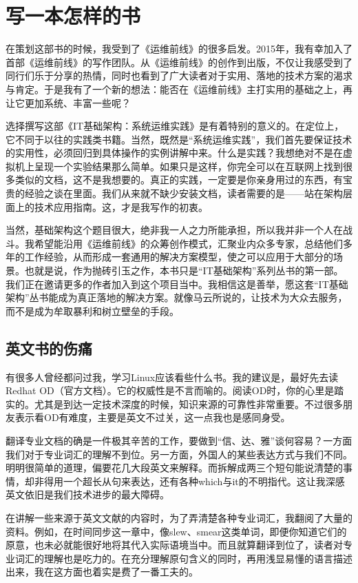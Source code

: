 \documentclass[12pt,UTF8]{ctexbook}
\begin{document}
\section{写一本怎样的书}

在策划这部书的时候，我受到了《运维前线》的很多启发。2015年，我有幸加入了首部《运维前线》的写作团队。从《运维前线》的创作到出版，不仅让我感受到了同行们乐于分享的热情，同时也看到了广大读者对于实用、落地的技术方案的渴求与肯定。于是我有了一个新的想法：能否在《运维前线》主打实用的基础之上，再让它更加系统、丰富一些呢？

选择撰写这部《IT基础架构：系统运维实践》是有着特别的意义的。在定位上，它不同于以往的实践类书籍。当然，既然是“系统运维实践”，我们首先要保证技术的实用性，必须回归到具体操作的实例讲解中来。什么是实践？我想绝对不是在虚拟机上呈现一个实验结果那么简单。如果只是这样，你完全可以在互联网上找到很多类似的文档，这不是我想要的。真正的实践，一定要是你亲身用过的东西，有宝贵的经验之谈在里面。我们从来就不缺少安装文档，读者需要的是——站在架构层面上的技术应用指南。这，才是我写作的初衷。

当然，基础架构这个题目很大，绝非我一人之力所能承担，所以我并非一个人在战斗。我希望能沿用《运维前线》的众筹创作模式，汇聚业内众多专家，总结他们多年的工作经验，从而形成一套通用的解决方案模型，使之可以应用于大部分的场景。也就是说，作为抛砖引玉之作，本书只是“IT基础架构”系列丛书的第一部。我们正在邀请更多的作者加入到这个项目当中。我相信这是善举，愿这套“IT基础架构”丛书能成为真正落地的解决方案。就像马云所说的，让技术为大众去服务，而不是成为牟取暴利和树立壁垒的手段。

\subsection{英文书的伤痛}

有很多人曾经都问过我，学习Linux应该看些什么书。我的建议是，最好先去读Redhat OD（官方文档）。它的权威性是不言而喻的。阅读OD时，你的心里是踏实的。尤其是到达一定技术深度的时候，知识来源的可靠性非常重要。不过很多朋友表示看OD有难度，主要是英文不过关，这一点我也是感同身受。

翻译专业文档的确是一件极其辛苦的工作，要做到“信、达、雅”谈何容易？一方面我们对于专业词汇的理解不到位。另一方面，外国人的某些表达方式与我们不同。明明很简单的道理，偏要花几大段英文来解释。而拆解成两三个短句能说清楚的事情，却非得用一个超长从句来表达，还有各种which与it的不明指代。这让我深感英文依旧是我们技术进步的最大障碍。

在讲解一些来源于英文文献的内容时，为了弄清楚各种专业词汇，我翻阅了大量的资料。例如，在时间同步这一章中，像slew、smear这类单词，即便你知道它们的原意，也未必就能很好地将其代入实际语境当中。而且就算翻译到位了，读者对专业词汇的理解也是吃力的。在充分理解原句含义的同时，再用浅显易懂的语言描述出来，我在这方面也着实是费了一番工夫的。
\end{document}
